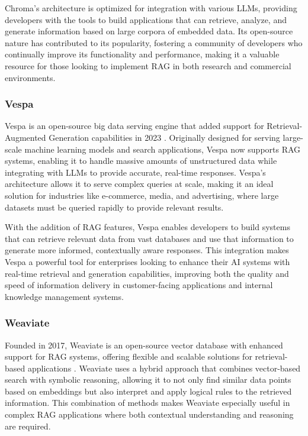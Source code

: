 Chroma's architecture is optimized for integration with various LLMs, providing developers with the tools to build applications that can retrieve, analyze, and generate information based on large corpora of embedded data. 
Its open-source nature has contributed to its popularity, fostering a community of developers who continually improve its functionality and performance, making it a valuable resource for those looking to implement RAG in both research and commercial environments.

\subsubsection{Vespa}

Vespa is an open-source big data serving engine that added support for Retrieval-Augmented Generation capabilities in 2023 \cite{Vespa}. 
Originally designed for serving large-scale machine learning models and search applications, Vespa now supports RAG systems, enabling it to handle massive amounts of unstructured data while integrating with LLMs to provide accurate, real-time responses. 
Vespa's architecture allows it to serve complex queries at scale, making it an ideal solution for industries like e-commerce, media, and advertising, where large datasets must be queried rapidly to provide relevant results.

With the addition of RAG features, Vespa enables developers to build systems that can retrieve relevant data from vast databases and use that information to generate more informed, contextually aware responses. 
This integration makes Vespa a powerful tool for enterprises looking to enhance their AI systems with real-time retrieval and generation capabilities, improving both the quality and speed of information delivery in customer-facing applications and internal knowledge management systems.

\subsubsection{Weaviate}

Founded in 2017, Weaviate is an open-source vector database with enhanced support for RAG systems, offering flexible and scalable solutions for retrieval-based applications \cite{Weaviate}. 
Weaviate uses a hybrid approach that combines vector-based search with symbolic reasoning, allowing it to not only find similar data points based on embeddings but also interpret and apply logical rules to the retrieved information. 
This combination of methods makes Weaviate especially useful in complex RAG applications where both contextual understanding and reasoning are required.

